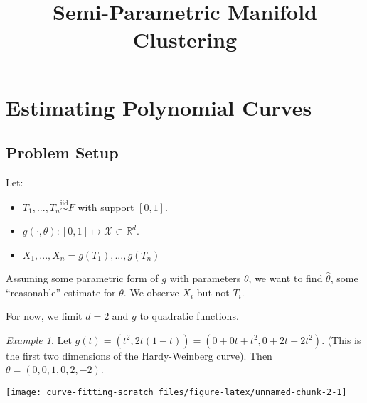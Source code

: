\documentclass[
  11pt,
]{article}
\title{Semi-Parametric Manifold Clustering}
\author{}
\date{\vspace{-2.5em}}
\providecommand{\tightlist}{%
  \setlength{\itemsep}{0pt}\setlength{\parskip}{0pt}}
\begin{document}
\maketitle

\newcommand{\diag}{\mathrm{diag}}
\newcommand{\tr}{\mathrm{Tr}}
\newcommand{\blockdiag}{\mathrm{blockdiag}}
\newcommand{\indep}{\stackrel{\mathrm{ind}}{\sim}}
\newcommand{\iid}{\stackrel{\mathrm{iid}}{\sim}}
\newcommand{\Bernoulli}{\mathrm{Bernoulli}}
\newcommand{\Betadist}{\mathrm{Beta}}
\newcommand{\Uniform}{\mathrm{Uniform}}
\newcommand{\BG}{\mathrm{BernoulliGraph}}
\newcommand{\Categorical}{\mathrm{Categorical}}
\newcommand{\Multinomial}{\mathrm{Multinomial}}
\newcommand{\RDPG}{\mathrm{RDPG}}
\newcommand{\GRDPG}{\mathrm{GRDPG}}
\newtheorem{definition}{Definition}
\newtheorem{theorem}{Theorem}
\newtheorem{lemma}{Lemma}
\theoremstyle{remark}
\newtheorem*{remark}{Remark}
\theoremstyle{example}
\newtheorem{example}{Example}
\newcommand{\dd}{\mathrm{d}}
\newcommand{\as}{\stackrel{\mathrm{a.s.}}{\to}}

\hypertarget{estimating-polynomial-curves}{%
\section{Estimating Polynomial
Curves}\label{estimating-polynomial-curves}}

\hypertarget{problem-setup}{%
\subsection{Problem Setup}\label{problem-setup}}

Let:

\begin{itemize}
\tightlist
\item
  \(T_1, ..., T_n \stackrel{\mathrm{iid}}{\sim}F\) with support
  \([0, 1]\).
\item
  \(g(\cdot, \theta) : [0, 1] \mapsto \mathcal{X} \subset \mathbb{R}^d\).
\item
  \(X_1, ..., X_n = g(T_1), ..., g(T_n)\)
\end{itemize}

Assuming some parametric form of \(g\) with parameters \(\theta\), we
want to find \(\hat{\theta}\), some ``reasonable'' estimate for
\(\theta\). We observe \(X_i\) but not \(T_i\).

For now, we limit \(d = 2\) and \(g\) to quadratic functions.

\begin{example}

Let $g(t) = (t^2, 2 t (1 - t) ) = (0 + 0 t + t^2, 0 + 2 t - 2 t^2)$. 
(This is the first two dimensions of the Hardy-Weinberg curve). 
Then $\theta = (0, 0, 1, 0, 2, -2)$.


\begin{center}\texttt{[image: curve-fitting-scratch\_files/figure-latex/unnamed-chunk-2-1]} \end{center}

\end{example}
\end{document}
